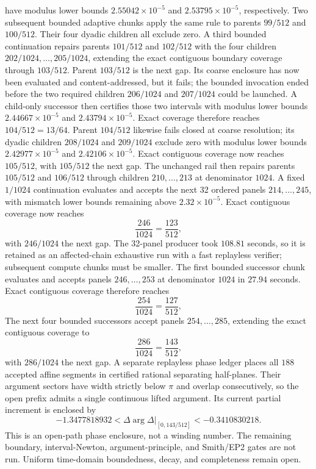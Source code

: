 \documentclass[11pt]{article}
\theoremstyle{definition}
\theoremstyle{remark}
\begin{document}
have modulus lower bounds \(2.55042\times10^{-5}\) and
\(2.53795\times10^{-5}\), respectively.  Two subsequent bounded adaptive
chunks apply the same rule to parents \(99/512\) and \(100/512\).  Their four
dyadic children all exclude zero.  A third bounded continuation repairs
parents \(101/512\) and \(102/512\) with the four children
\(202/1024,\ldots,205/1024\), extending the exact contiguous boundary
coverage through \(103/512\).  Parent \(103/512\) is the next
gap.  Its coarse enclosure has now been evaluated and content-addressed,
but it fails; the bounded invocation ended before the two required children
\(206/1024\) and \(207/1024\) could be launched.  A child-only successor
then certifies those two intervals with modulus lower bounds
\(2.44667\times10^{-5}\) and \(2.43794\times10^{-5}\).  Exact coverage
therefore reaches \(104/512=13/64\).  Parent \(104/512\) likewise fails
closed at coarse resolution; its dyadic children \(208/1024\) and
\(209/1024\) exclude zero with modulus lower bounds
\(2.42977\times10^{-5}\) and \(2.42106\times10^{-5}\).  Exact contiguous
coverage now reaches \(105/512\), with \(105/512\) the next gap.
The unchanged rail then repairs parents \(105/512\) and \(106/512\)
through children \(210,\ldots,213\) at denominator \(1024\).  A fixed
\(1/1024\) continuation evaluates and accepts the next 32 ordered panels
\(214,\ldots,245\), with mismatch lower bounds remaining above
\(2.32\times10^{-5}\).  Exact contiguous coverage now reaches
\[
 \frac{246}{1024}=\frac{123}{512},
\]
with \(246/1024\) the next gap.  The 32-panel producer took \(108.81\)
seconds, so it is retained as an affected-chain exhaustive run with a fast
replayless verifier; subsequent compute chunks must be smaller.
The first bounded successor chunk evaluates and accepts panels
\(246,\ldots,253\) at denominator \(1024\) in \(27.94\) seconds.  Exact
contiguous coverage therefore reaches
\[
 \frac{254}{1024}=\frac{127}{512},
\]
The next four bounded successors accept panels \(254,\ldots,285\), extending
the exact contiguous coverage to
\[
 \frac{286}{1024}=\frac{143}{512},
\]
with \(286/1024\) the next gap.  A separate replayless phase ledger places
all \(188\) accepted affine segments in certified rational separating
half-planes.  Their argument sectors have width strictly below \(\pi\) and
overlap consecutively, so the open prefix admits a single continuous lifted
argument.  Its current partial increment is enclosed by
\[
 -1.3477818932
 <
 \Delta\arg\Delta\big|_{[0,143/512]}
 <
 -0.3410830218 .
\]
This is an open-path phase enclosure, not a winding number.
The remaining boundary, interval-Newton, argument-principle, and Smith/EP2
gates are not run.
Uniform time-domain boundedness, decay, and completeness remain open.
\end{document}
